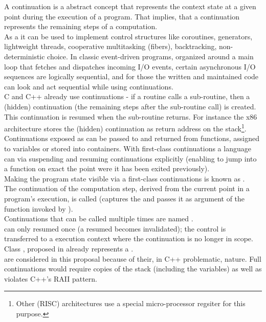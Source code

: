 
A continuation is a abstract concept that represents the context state at a
given point during the execution of a program. That implies, that a continuation
represents the remaining steps of a computation.\\

As a  it can be used to implement control
structures like coroutines,  generators, lightweight threads, cooperative
multitasking (fibers), backtracking, non-deterministic choice. In classic
event-driven programs, organized around a main loop that fetches and dispatches
incoming I/O events, certain asynchronous I/O sequences are logically
sequential, and for those the written and maintained code can look and act
sequential while using continuations.\\

C and C++ already use continuations - if a routine calls a sub-routine, then a
(hidden) continuation (the remaining steps after the sub-routine call) is
created. This continuation is resumed when the sub-routine returns. For
instance the x86 architecture stores the (hidden) continuation as return address
on the stack\footnote{Other (RISC) architectures use a special micro-processor
regsiter for this purpose.}.\\

Continuations exposed as  can be passed to and
returned from functions, assigned to variables or stored into containers. With
first-class continuations a language can 
via suspending and resuming continuations explicitly (enabling to jump into a
function on exact the point were it has been exited previously).\\
Making the program state visible via a first-class continuations is known as
.\\

The continuation of the computation step, derived from the current point in a
program's execution, is called  (\cc captures the
 and passes it as argument of the function invoked by
\cc).\\

Continuations that can be called multiple times are named
.\\
 can only resumed once (a resumed 
 becomes invalidated); the control is transferred to
a execution context where the continuation is no longer in scope.\\
Class , proposed in \cite{P0099R1}
already represents a .\\
 are  considered in this proposal because of
their, in C++ problematic, nature.  Full continuations would require copies of
the stack (including the variables) as well as violates C++'s RAII pattern.\\

